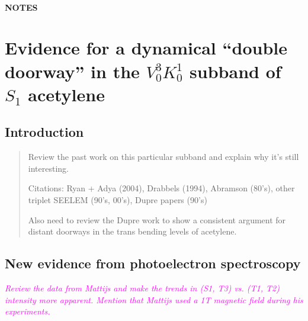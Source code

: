 \documentclass[12pt]{mitthesis}
\newcommand{\POINT}[1]{\textcolor{magenta}{\emph{#1}}}
\begin{document}
\tableofcontents
\clearpage

\subsubsection*{NOTES}
\clearpage

\chapter{Evidence for a dynamical ``double doorway'' in the
  $V^3_0K^1_0$ subband of $S_1$ acetylene}

\section{Introduction}

\begin{quote}
  Review the past work on this particular subband and explain why it's
  still interesting.

  Citations: Ryan + Adya (2004), Drabbels (1994), Abramson (80's),
  other triplet SEELEM (90's, 00's), Dupre papers (90's)

  Also need to review the Dupre work to show a consistent argument for
  distant doorways in the trans bending levels of acetylene.
\end{quote}

\section{New evidence from photoelectron spectroscopy}

\POINT{Review the data from Mattijs and make the trends in (S1, T3)
vs. (T1, T2) intensity more apparent. Mention that Mattijs used a 1T
magnetic field during his experiments.}
\end{document}

